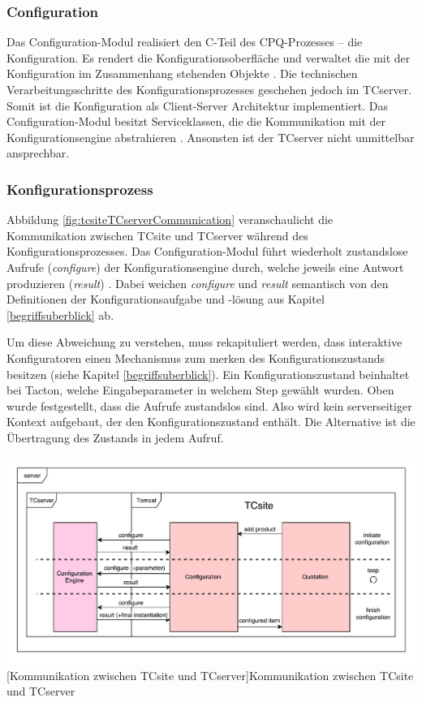 \documentclass[11pt, a4paper, titlepage, listof=totoc, bibliography=totoc, index=totoc, twoside, openright, headings=normal]{scrreprt}
\begin{document}
\subsubsection*{Configuration}
Das Configuration-Modul realisiert den C-Teil des CPQ-Prozesses -- die Konfiguration. Es rendert die Konfigurationsoberfläche und verwaltet die mit der Konfiguration im Zusammenhang stehenden Objekte \citep{tactonTCsiteDevelopmentManual}. Die  technischen Verarbeitungsschritte des Konfigurationsprozesses geschehen jedoch im TCserver. Somit ist die Konfiguration als Client-Server Architektur implementiert. Das Configuration-Modul besitzt Serviceklassen, die die Kommunikation mit der Konfigurationsengine abstrahieren \citep{tactonTCsiteApiDocu}. Ansonsten ist der TCserver nicht unmittelbar ansprechbar.

\subsubsection{Konfigurationsprozess}
\label{TCsiteKonfigurationsprozess}

Abbildung \ref{fig:tcsiteTCserverCommunication} veranschaulicht die Kommunikation zwischen TCsite und TCserver während des Konfigurationsprozesses. Das Configuration-Modul führt wiederholt zustandslose Aufrufe (\emph{configure}) der Konfigurationsengine durch, welche jeweils eine Antwort produzieren (\emph{result}) \citep{tactonTCsiteDevelopmentManual}. Dabei weichen \emph{configure} und \emph{result} semantisch von den Definitionen der Konfigurationsaufgabe und -lösung aus Kapitel \ref{begriffsuberblick} ab.

Um diese Abweichung zu verstehen, muss rekapituliert werden, dass interaktive Konfiguratoren einen Mechanismus zum merken des Konfigurationszustands besitzen (siehe Kapitel \ref{begriffsuberblick}). Ein Konfigurationszustand beinhaltet bei Tacton, welche Eingabeparameter in welchem Step gewählt wurden. Oben wurde festgestellt, dass die Aufrufe zustandslos sind. Also wird kein serverseitiger Kontext aufgebaut, der den Konfigurationszustand enthält. Die Alternative ist die Übertragung des Zustands in jedem Aufruf.

\vspace{1em}
\begin{minipage}{\linewidth}
	\centering
	\includegraphics[width=1\linewidth]{Abbildungen/tcsiteTCserverCommunication.pdf}
	[Kommunikation zwischen TCsite und TCserver]{Kommunikation zwischen TCsite und TCserver}
	\label{fig:tcsiteTCserverCommunication}
\end{minipage}
\vspace{0.3em}
\end{document}
